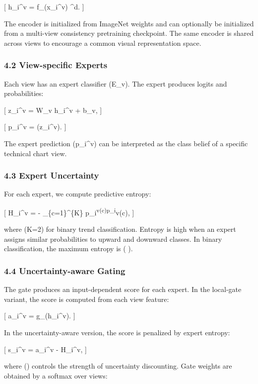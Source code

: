 \documentclass[
]{article}
\begin{document}
{[} h\_i\^{}v = f\_\theta(x\_i\^{}v) \in {}\^{}d. {]}

The encoder is initialized from ImageNet weights and can optionally be
initialized from a multi-view consistency pretraining checkpoint. The
same encoder is shared across views to encourage a common visual
representation space.

\subsubsection{4.2 View-specific Experts}\label{view-specific-experts}

Each view has an expert classifier (E\_v). The expert produces logits
and probabilities:

{[} z\_i\^{}v = W\_v h\_i\^{}v + b\_v, {]}

{[} p\_i\^{}v = (z\_i\^{}v). {]}

The expert prediction (p\_i\^{}v) can be interpreted as the class belief
of a specific technical chart view.

\subsubsection{4.3 Expert Uncertainty}\label{expert-uncertainty}

For each expert, we compute predictive entropy:

{[} H\_i\^{}v = - \sum\_\{c=1\}\^{}\{K\}
p\_i\textsuperscript{v(c)\log p\_i}v(c), {]}

where (K=2) for binary trend classification. Entropy is high when an
expert assigns similar probabilities to upward and downward classes. In
binary classification, the maximum entropy is ( ).

\subsubsection{4.4 Uncertainty-aware
Gating}\label{uncertainty-aware-gating}

The gate produces an input-dependent score for each expert. In the
local-gate variant, the score is computed from each view feature:

{[} a\_i\^{}v = g\_\psi(h\_i\^{}v). {]}

In the uncertainty-aware version, the score is penalized by expert
entropy:

{[} s\_i\^{}v = a\_i\^{}v - \lambda H\_i\^{}v, {]}

where (\lambda) controls the strength of uncertainty discounting. Gate
weights are obtained by a softmax over views:
\end{document}
